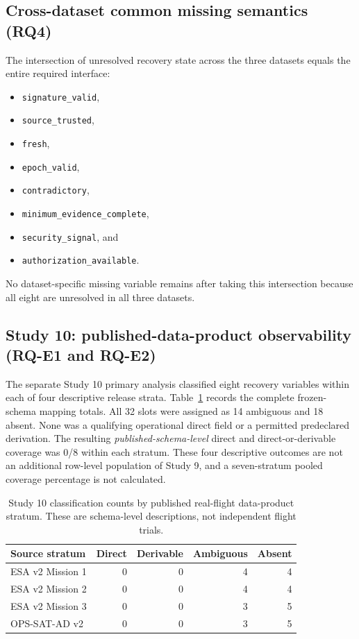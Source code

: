 \documentclass[preprint,12pt]{elsarticle}
\begin{document}
\subsection{Cross-dataset common missing semantics (RQ4)}

The intersection of unresolved recovery state across the three datasets equals the entire required interface:
\begin{itemize}[nosep,leftmargin=*]
    \item \texttt{signature\_valid},
    \item \texttt{source\_trusted},
    \item \texttt{fresh},
    \item \texttt{epoch\_valid},
    \item \texttt{contradictory},
    \item \texttt{minimum\_evidence\_complete},
    \item \texttt{security\_signal}, and
    \item \texttt{authorization\_available}.
\end{itemize}
No dataset-specific missing variable remains after taking this intersection because all eight are unresolved in all three datasets.


\subsection{Study 10: published-data-product observability (RQ-E1 and RQ-E2)}
The separate Study 10 primary analysis classified eight recovery variables within each of four descriptive release strata. Table~\ref{tab:study10coverage} records the complete frozen-schema mapping totals. All 32 slots were assigned as 14 ambiguous and 18 absent. None was a qualifying operational direct field or a permitted predeclared derivation. The resulting \emph{published-schema-level} direct and direct-or-derivable coverage was 0/8 within each stratum. These four descriptive outcomes are not an additional row-level population of Study 9, and a seven-stratum pooled coverage percentage is not calculated.

\begin{table}[htbp]
\centering
\caption{Study 10 classification counts by published real-flight data-product stratum. These are schema-level descriptions, not independent flight trials.}
\label{tab:study10coverage}
\begin{tabular}{lrrrr}
\toprule
Source stratum & Direct & Derivable & Ambiguous & Absent \\
\midrule
ESA v2 Mission 1 & 0 & 0 & 4 & 4 \\
ESA v2 Mission 2 & 0 & 0 & 4 & 4 \\
ESA v2 Mission 3 & 0 & 0 & 3 & 5 \\
OPS-SAT-AD v2 & 0 & 0 & 3 & 5 \\
\bottomrule
\end{tabular}
\end{table}
\end{document}
